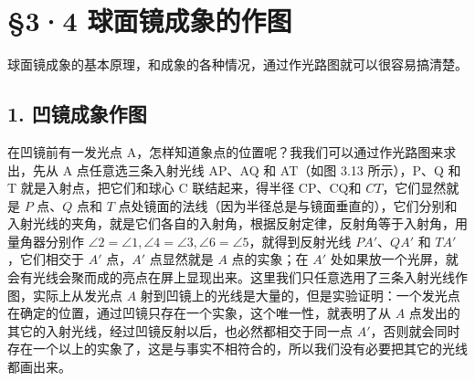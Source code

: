 \section{§3·4
球面镜成象的作图}

球面镜成象的基本原理，和成象的各种情况，通过作光路图就可以很容易搞清楚。

\subsection{1. 凹镜成象作图}

在凹镜前有一发光点
A，怎样知道象点的位置呢？我我们可以通过作光路图来求出，先从 A
点任意选三条入射光线 AP、AQ 和 AT（如图 3.13 所示），P、Q 和 T
就是入射点，把它们和球心 C 联结起来，得半径 CP、CQ和
\(CT\)，它们显然就是 \(P\) 点、\(Q\) 点和 \(T\)
点处镜面的法线（因为半径总是与镜面垂直的），它们分别和入射光线的夹角，就是它们各自的入射角，根据反射定律，反射角等于入射角，用量角器分别作
\(\angle 2 = \angle 1, \angle 4 = \angle 3, \angle 6 = \angle 5\)，就得到反射光线
\(PA'\)、\(QA'\) 和 \(TA'\)，它们相交于 \(A'\) 点，\(A'\) 点显然就是
\(A\) 点的实象；在 \(A'\)
处如果放一个光屏，就会有光线会聚而成的亮点在屏上显现出来。这里我们只任意选用了三条入射光线作图，实际上从发光点
\(A\)
射到凹镜上的光线是大量的，但是实验证明：一个发光点在确定的位置，通过凹镜只存在一个实象，这个唯一性，就表明了从
\(A\) 点发出的其它的入射光线，经过凹镜反射以后，也必然都相交于同一点
\(A'\)，否则就会同时存在一个以上的实象了，这是与事实不相符合的，所以我们没有必要把其它的光线都画出来。

